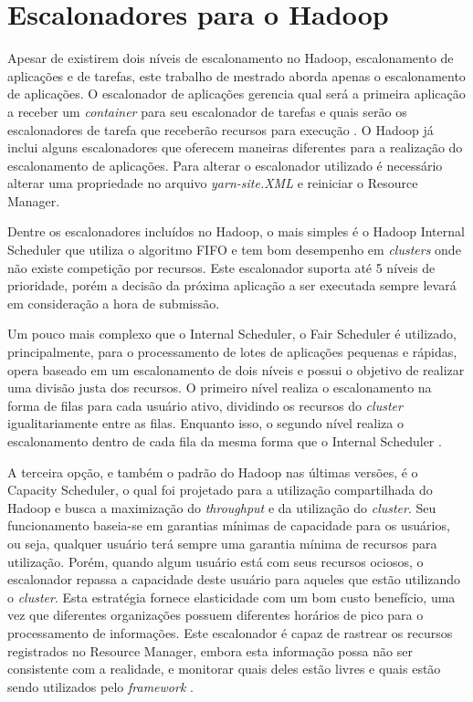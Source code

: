 \section{Escalonadores para o Hadoop}
\label{sec:HadSched}
Apesar de existirem dois níveis de escalonamento no Hadoop, escalonamento de aplicações e de tarefas, este trabalho de mestrado aborda apenas o escalonamento de aplicações. O escalonador de aplicações gerencia qual será a primeira aplicação a receber um \textit{container} para seu escalonador de tarefas e quais serão os escalonadores de tarefa que receberão recursos para execução \cite{BookHadoop}. O Hadoop já inclui alguns escalonadores que oferecem maneiras diferentes para a realização do escalonamento de aplicações. Para alterar o escalonador utilizado é necessário alterar uma propriedade no arquivo \textit{yarn-site.XML} e reiniciar o Resource Manager.

Dentre os escalonadores incluídos no Hadoop, o mais simples é o Hadoop Internal Scheduler que utiliza o algoritmo FIFO e tem bom desempenho em \textit{clusters} onde não existe competição por recursos. Este escalonador suporta até 5 níveis de prioridade, porém a decisão da próxima aplicação a ser executada sempre levará em consideração a hora de submissão.

Um pouco mais complexo que o Internal Scheduler, o Fair Scheduler é utilizado, principalmente, para o processamento de lotes de aplicações pequenas e rápidas, opera baseado em um escalonamento de dois níveis e possui o objetivo de realizar uma divisão justa dos recursos. O primeiro nível realiza o escalonamento na forma de filas para cada usuário ativo, dividindo os recursos do \textit{cluster} igualitariamente entre as filas. Enquanto isso, o segundo nível realiza o escalonamento dentro de cada fila da mesma forma que o Internal Scheduler \cite{FairScheduler}. 

A terceira opção, e também o padrão do Hadoop nas últimas versões, é o Capacity Scheduler, o qual foi projetado para a utilização compartilhada do Hadoop e busca a maximização do \textit{throughput} e da utilização do \textit{cluster}. Seu funcionamento baseia-se em garantias mínimas de capacidade para os usuários, ou seja, qualquer usuário terá sempre uma garantia mínima de recursos para utilização. Porém, quando algum usuário está com seus recursos ociosos, o escalonador repassa a capacidade deste usuário  para aqueles que estão utilizando o \textit{cluster}. Esta estratégia fornece elasticidade com um bom custo benefício, uma vez que diferentes organizações possuem diferentes horários de pico para o processamento de informações. Este escalonador é capaz de rastrear os recursos registrados no Resource Manager, embora esta informação possa não ser consistente com a realidade, e monitorar quais deles estão livres e quais estão sendo utilizados pelo \textit{framework} \cite{CapacityScheduler}.

